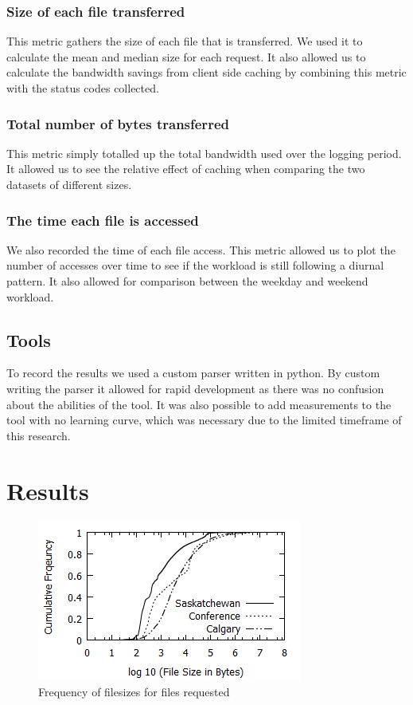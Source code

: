 \documentclass[10pt,conference]{IEEEtran}
\begin{document}
\subsubsection{Size of each file transferred}
This metric gathers the size of each file that is transferred. We used it to calculate the mean and median size for each request. 
It also allowed us to calculate the bandwidth savings from client side caching by combining this metric with the status codes collected.

\subsubsection{Total number of bytes transferred}
This metric simply totalled up the total bandwidth used over the logging period. It allowed us to see the relative effect of caching when comparing the two datasets of different sizes.

\subsubsection{The time each file is accessed}
We also recorded the time of each file access. This metric allowed us to plot the number of accesses over time to see if the workload is still following a diurnal pattern. It also allowed for comparison between the weekday and weekend workload.

\subsection{Tools}
To record the results we used a custom parser written in python. By custom writing the parser it allowed for rapid development as there was no confusion about the abilities of the tool. It was also possible to add measurements to the tool with no learning curve, which was necessary due to the limited timeframe of this research.

\section{Results}\label{results}

\begin{figure}[t]
    \includegraphics{images/filesize}
    \caption{Frequency of filesizes for files requested}\label{fig:filesize}
\end{figure}
\end{document}
